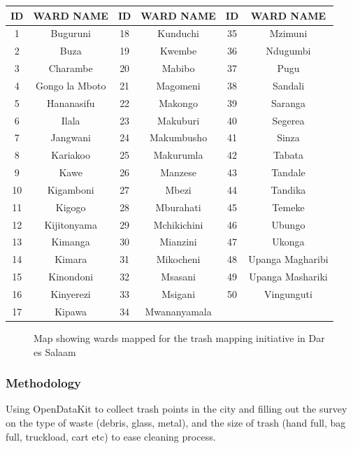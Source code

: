 \documentclass[a4paper,12pt,twoside]{article}
\begin{document}
\begin{center}
\begin{tabular}{|c|c|c|c|c|c|}
\hline
ID & WARD NAME & ID & WARD NAME & ID & WARD NAME\\
\hline
1 & Buguruni & 18 & Kunduchi & 35 & Mzimuni\\
2 & Buza & 19 & Kwembe & 36 & Ndugumbi\\
3 & Charambe & 20 & Mabibo & 37 & Pugu\\
4 & Gongo la Mboto & 21 & Magomeni & 38 & Sandali\\
5 & Hananasifu & 22 & Makongo & 39 & Saranga\\
6 & Ilala & 23 & Makuburi & 40 & Segerea\\
7 & Jangwani & 24 & Makumbusho & 41 & Sinza\\
8 & Kariakoo & 25 & Makurumla & 42 & Tabata\\
9 & Kawe & 26 & Manzese & 43 & Tandale\\
10 & Kigamboni & 27 & Mbezi & 44 & Tandika\\
11 & Kigogo & 28 & Mburahati & 45 & Temeke\\
12 & Kijitonyama & 29 & Mchikichini & 46 & Ubungo\\
13 & Kimanga & 30 & Mianzini & 47 & Ukonga\\
14 & Kimara & 31 & Mikocheni & 48 & Upanga Magharibi\\
15 & Kinondoni & 32 & Msasani & 49 & Upanga Mashariki\\
16 & Kinyerezi & 33 & Msigani & 50 & Vingunguti\\
17 & Kipawa & 34 & Mwananyamala & {} & {}\\
 \hline
\end{tabular}
\end{center}

\begin{figure}[h]
  \caption{Map showing wards mapped for the trash mapping initiative in Dar es Salaam}
  \centering
\end{figure}

\subsubsection{Methodology}
Using OpenDataKit to collect trash points in the city and filling out the survey on the type of waste (debris, glass, metal), and the size of trash (hand full, bag full, truckload, cart etc) to ease cleaning process.
\medskip
\end{document}
